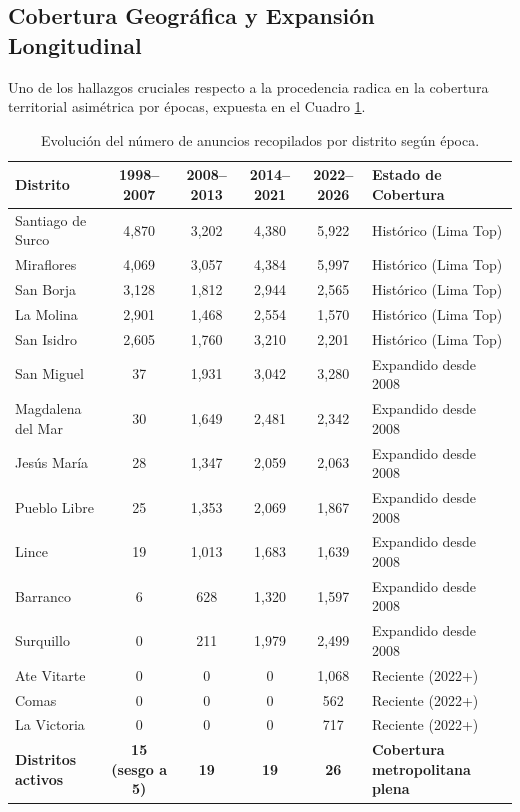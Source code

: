 \documentclass[11pt,a4paper]{article}
\begin{document}
\subsection{Cobertura Geográfica y Expansión Longitudinal}
Uno de los hallazgos cruciales respecto a la procedencia radica en la cobertura territorial asimétrica por épocas, expuesta en el Cuadro \ref{tab:cobertura_distritos}.

\begin{table}[H]
\centering
\small
\caption{Evolución del número de anuncios recopilados por distrito según época.}
\label{tab:cobertura_distritos}
\begin{tabularx}{\textwidth}{lccccX}
\toprule
\textbf{Distrito} & \textbf{1998--2007} & \textbf{2008--2013} & \textbf{2014--2021} & \textbf{2022--2026} & \textbf{Estado de Cobertura} \\
\midrule
Santiago de Surco & 4,870 & 3,202 & 4,380 & 5,922 & Histórico (Lima Top) \\
Miraflores & 4,069 & 3,057 & 4,384 & 5,997 & Histórico (Lima Top) \\
San Borja & 3,128 & 1,812 & 2,944 & 2,565 & Histórico (Lima Top) \\
La Molina & 2,901 & 1,468 & 2,554 & 1,570 & Histórico (Lima Top) \\
San Isidro & 2,605 & 1,760 & 3,210 & 2,201 & Histórico (Lima Top) \\
San Miguel & 37 & 1,931 & 3,042 & 3,280 & Expandido desde 2008 \\
Magdalena del Mar & 30 & 1,649 & 2,481 & 2,342 & Expandido desde 2008 \\
Jesús María & 28 & 1,347 & 2,059 & 2,063 & Expandido desde 2008 \\
Pueblo Libre & 25 & 1,353 & 2,069 & 1,867 & Expandido desde 2008 \\
Lince & 19 & 1,013 & 1,683 & 1,639 & Expandido desde 2008 \\
Barranco & 6 & 628 & 1,320 & 1,597 & Expandido desde 2008 \\
Surquillo & 0 & 211 & 1,979 & 2,499 & Expandido desde 2008 \\
Ate Vitarte & 0 & 0 & 0 & 1,068 & Reciente (2022+) \\
Comas & 0 & 0 & 0 & 562 & Reciente (2022+) \\
La Victoria & 0 & 0 & 0 & 717 & Reciente (2022+) \\
\midrule
\textbf{Distritos activos} & \textbf{15 (sesgo a 5)} & \textbf{19} & \textbf{19} & \textbf{26} & \textbf{Cobertura metropolitana plena} \\
\bottomrule
\end{tabularx}
\end{table}
\end{document}

